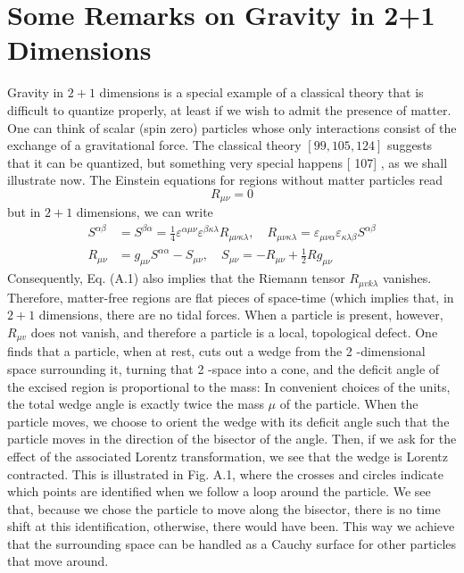 \documentclass[main.tex]{subfiles}
\begin{document}
\section{Some Remarks on Gravity in 2+1 Dimensions}

Gravity in $2+1$ dimensions is a special example of a classical theory that is difficult to quantize properly, at least if we wish to admit the presence of matter. One can think of scalar (spin zero) particles whose only interactions consist of the exchange of a gravitational force. The classical theory $[99,105,124]$ suggests that it can be quantized, but something very special happens [ 107] , as we shall illustrate now. The Einstein equations for regions without matter particles read
$$
R_{\mu \nu}=0
$$
but in $2+1$ dimensions, we can write
$$
\begin{aligned}
S^{\alpha \beta} &=S^{\beta \alpha}=\frac{1}{4} \varepsilon^{\alpha \mu \nu} \varepsilon^{\beta \kappa \lambda} R_{\mu \nu \kappa \lambda}, \quad R_{\mu \nu \kappa \lambda}=\varepsilon_{\mu \nu \alpha} \varepsilon_{\kappa \lambda \beta} S^{\alpha \beta} \\
R_{\mu \nu} &=g_{\mu \nu} S^{\alpha \alpha}-S_{\mu \nu}, \quad S_{\mu \nu}=-R_{\mu \nu}+\frac{1}{2} R g_{\mu \nu}
\end{aligned}
$$
Consequently, Eq. (A.1) also implies that the Riemann tensor $R_{\mu v k \lambda}$ vanishes. Therefore, matter-free regions are flat pieces of space-time (which implies that,
in $2+1$ dimensions, there are no tidal forces. When a particle is present, however, $R_{\mu v}$ does not vanish, and therefore a particle is a local, topological defect. One finds that a particle, when at rest, cuts out a wedge from the 2 -dimensional space surrounding it, turning that 2 -space into a cone, and the deficit angle of the excised region is proportional to the mass: In convenient choices of the units, the total wedge angle is exactly twice the mass $\mu$ of the particle. When the particle moves, we choose to orient the wedge with its deficit angle such that the particle moves in the direction of the bisector of the angle. Then, if we ask for the effect of the associated Lorentz transformation, we see that the wedge is Lorentz contracted. This is illustrated in Fig. A.1, where the crosses and circles indicate which points are identified when we follow a loop around the particle. We see that, because we chose the particle to move along the bisector, there is no time shift at this identification, otherwise, there would have been. This way we achieve that the surrounding space can be handled as a Cauchy surface for other particles that move around.
\end{document}
